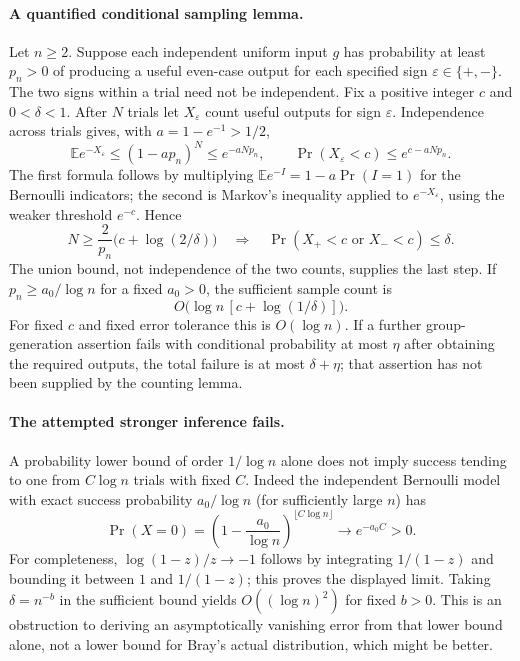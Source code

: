 \documentclass[11pt]{article}
\begin{document}
\paragraph{A quantified conditional sampling lemma.}
Let $n\ge2$. Suppose each independent uniform input $g$ has probability at least $p_n>0$ of producing a useful even-case output for each specified sign $\varepsilon\in\{+,-\}$. The two signs within a trial need not be independent. Fix a positive integer $c$ and $0<\delta<1$. After $N$ trials let $X_\varepsilon$ count useful outputs for sign $\varepsilon$. Independence across trials gives, with $a=1-e^{-1}>1/2$,
\[
 \mathbb E e^{-X_\varepsilon}\le (1-a p_n)^N\le e^{-aNp_n},
 \qquad
 \Pr(X_\varepsilon<c)\le e^{c-aNp_n}.
\]
The first formula follows by multiplying $\mathbb E e^{-I}=1-a\Pr(I=1)$ for the Bernoulli indicators; the second is Markov's inequality applied to $e^{-X_\varepsilon}$, using the weaker threshold $e^{-c}$. Hence
\[
 N\ge \frac{2}{p_n}\bigl(c+\log(2/\delta)\bigr)
 \quad\Longrightarrow\quad
 \Pr(X_+<c\text{ or }X_-<c)\le\delta.
\]
The union bound, not independence of the two counts, supplies the last step. If $p_n\ge a_0/\log n$ for a fixed $a_0>0$, the sufficient sample count is
\[
 O\bigl(\log n\,[c+\log(1/\delta)]\bigr).
\]
For fixed $c$ and fixed error tolerance this is $O(\log n)$. If a further group-generation assertion fails with conditional probability at most $\eta$ after obtaining the required outputs, the total failure is at most $\delta+\eta$; that assertion has not been supplied by the counting lemma.

\paragraph{The attempted stronger inference fails.}
A probability lower bound of order $1/\log n$ alone does not imply success tending to one from $C\log n$ trials with fixed $C$. Indeed the independent Bernoulli model with exact success probability $a_0/\log n$ (for sufficiently large $n$) has
\[
 \Pr(X=0)=\left(1-\frac{a_0}{\log n}\right)^{\lfloor C\log n\rfloor}
 \longrightarrow e^{-a_0C}>0.
\]
For completeness, $\log(1-z)/z\to-1$ follows by integrating $1/(1-z)$ and bounding it between $1$ and $1/(1-z)$; this proves the displayed limit. Taking $\delta=n^{-b}$ in the sufficient bound yields $O((\log n)^2)$ for fixed $b>0$. This is an obstruction to deriving an asymptotically vanishing error from that lower bound alone, not a lower bound for Bray's actual distribution, which might be better.
\end{document}
